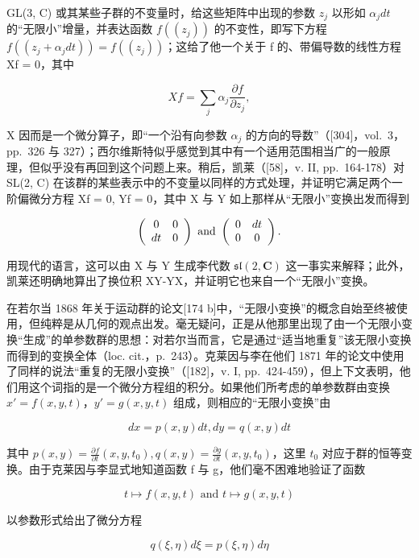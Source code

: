 GL(3, C) 或其某些子群的不变量时，给这些矩阵中出现的参数 \(z_{j}\) 以形如 \(\alpha_{j}dt\) 的“无限小”增量，并表达函数 \(f((z_{j}))\) 的不变性，即写下方程 \(f((z_{j} + \alpha_{j}dt)) = f((z_{j}))\)；这给了他一个关于 f 的、带偏导数的线性方程 Xf = 0，其中

\[
X f = \sum_ {j} \alpha_ {j} \frac {\partial f}{\partial z _ {j}},\tag{25.1}
\]

X 因而是一个微分算子，即“一个沿有向参数 \(\alpha_{j}\) 的方向的导数”（{[}304{]}，vol.~3，pp.~326 与 327）；西尔维斯特似乎感觉到其中有一个适用范围相当广的一般原理，但似乎没有再回到这个问题上来。稍后，凯莱（{[}58{]}，v. II, pp.~164-178）对 SL(2, C) 在该群的某些表示中的不变量以同样的方式处理，并证明它满足两个一阶偏微分方程 Xf = 0, Yf = 0，其中 X 与 Y 如上那样从“无限小”变换出发而得到

\[
\left( \begin{array}{c c} 0 & 0 \\ d t & 0 \end{array} \right) \text {   and   } \left( \begin{array}{c c} 0 & d t \\ 0 & 0 \end{array} \right).
\]

用现代的语言，这可以由 X 与 Y 生成李代数 \(\mathfrak{sl}(2,\mathbf{C})\) 这一事实来解释；此外，凯莱还明确地算出了换位积 XY-YX，并证明它也来自一个“无限小”变换。

在若尔当 1868 年关于运动群的论文{[}174 b{]}中，“无限小变换”的概念自始至终被使用，但纯粹是从几何的观点出发。毫无疑问，正是从他那里出现了由一个无限小变换“生成”的单参数群的思想：对若尔当而言，它是通过“适当地重复”该无限小变换而得到的变换全体（loc. cit.，p.~243）。克莱因与李在他们 1871 年的论文中使用了同样的说法“重复的无限小变换”（{[}182{]}，v. I, pp.~424-459），但上下文表明，他们用这个词指的是一个微分方程组的积分。如果他们所考虑的单参数群由变换 \(x' = f(x, y, t)\)，\(y' = g(x, y, t)\) 组成，则相应的“无限小变换”由

\[
d x = p (x, y) d t, d y = q (x, y) d t
\]

其中 \(p(x,y)=\frac{\partial f}{\partial t}(x,y,t_{0}),q(x,y)=\frac{\partial g}{\partial t}(x,y,t_{0})\)，这里 \(t_{0}\) 对应于群的恒等变换。由于克莱因与李显式地知道函数 f 与 g，他们毫不困难地验证了函数

\[
t \mapsto f (x, y, t) \text {   and   } t \mapsto g (x, y, t)
\]

以参数形式给出了微分方程

\[
q (\xi , \eta) d \xi = p (\xi , \eta) d \eta
\]

